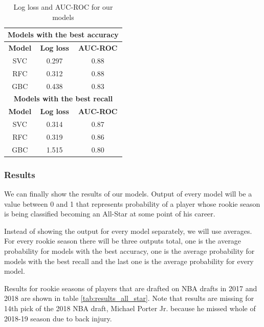 \documentclass[a4paper]{article}
\begin{document}
\begin{table}[!h]
\begin{center}
\begin{tabular}{|c|c|c|} \hline
\multicolumn{3}{|c|}{\textbf{Models with the best accuracy}} \\ \hline
\textbf{Model} & \textbf{Log loss} & \textbf{AUC-ROC} \\ \hline
SVC & 0.297 & 0.88 \\ \hline
RFC & 0.312 & 0.88 \\ \hline
GBC & 0.438 & 0.83 \\ \hline
\multicolumn{3}{|c|}{\textbf{Models with the best recall}} \\ \hline
\textbf{Model} & \textbf{Log loss} & \textbf{AUC-ROC} \\ \hline
SVC & 0.314 & 0.87 \\ \hline
RFC & 0.319 & 0.86 \\ \hline
GBC & 1.515 & 0.80 \\ \hline
\end{tabular}
\caption{Log loss and AUC-ROC for our models}
\label{tab:aucroc_logloss_all_star}
\end{center}
\end{table}

\subsubsection{Results}
\label{subsubsec:results_all_star}

We can finally show the results of our models. Output of every model will be a value between 0 and 1 that represents probability of a player whose rookie season is being classified becoming an All-Star at some point of his career. 

Instead of showing the output for every model separately, we will use averages. For every rookie season there will be three outputs total, one is the average probability for models with the best accuracy, one is the average probability for models with the best recall and the last one is the average probability for every model.

Results for rookie seasons of players that are drafted on NBA drafts in 2017 and 2018 are shown in table \ref{tab:results_all_star}. Note that results are missing for 14th pick of the 2018 NBA draft, Michael Porter Jr. because he missed whole of 2018-19 season due to back injury.
\end{document}
